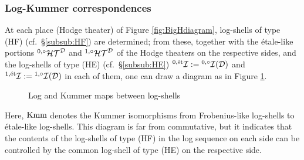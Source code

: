 \documentclass[12pt, reqno, a4paper]{amsart}
\def\cD{{\mathcal{D}}}
\def\et{\textrm{\'et}}
\begin{document}
\subsubsection{Log-Kummer correspondences}\label{subsub:logKummerCorr}
At each place (Hodge theater) of Figure \ref{fig:BigHdiagram}, log-shells of type (HF) (cf.\ \S\ref{subsub:HF}) are determined; from these, together with the \'etale-like portions $\HT[0,\circ]^{\cD}$ and $\HT[1,\circ]^{\cD}$ of the Hodge theaters on the respective sides, and the log-shells of type (HE) (cf.\ \S\ref{subsub:HE}) $\LS[0,\et]:=\LS[0,\circ](\cD)$ and $\LS[1,\et]:=\LS[1,\circ](\cD)$ in each of them, one can draw a diagram as in Figure \ref{fig:logKummerMaps}.
\begin{figure}[tbh]
\caption{Log and Kummer maps between log-shells}
\label{fig:logKummerMaps}
\end{figure}

Here, $\Kmm$ denotes the Kummer isomorphisms from Frobenius-like log-shells to \'etale-like log-shells.
This diagram is far from commutative, but it indicates that the contents of the log-shells of type (HF) in the log sequence on each side can be controlled by the common log-shell of type (HE) on the respective side.
\end{document}
